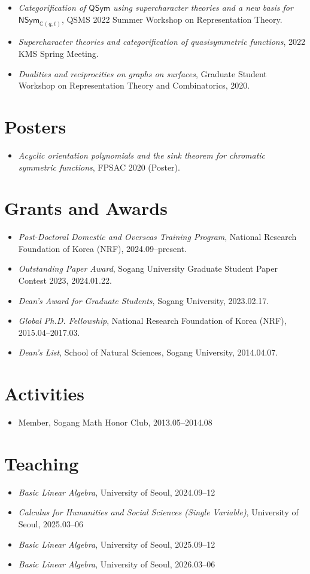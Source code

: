 \documentclass[11pt,a4paper]{article}
\newcommand{\cvsection}[1]{\Needspace{4\baselineskip}\section*{#1}}
\begin{document}
\begin{itemize}
  Miniworkshop on Representation Theory of $0$-Hecke Algebras and Related Topics, 2023.02.
\item \emph{Categorification of $\mathsf{QSym}$ using supercharacter theories and a new basis for $\mathsf{NSym}_{\mathbb C(q,t)}$},
  QSMS 2022 Summer Workshop on Representation Theory.
\item \emph{Supercharacter theories and categorification of quasisymmetric functions},
  2022 KMS Spring Meeting.
\item \emph{Dualities and reciprocities on graphs on surfaces},
  Graduate Student Workshop on Representation Theory and Combinatorics, 2020.
\end{itemize}

\cvsection{Posters}
\begin{itemize}
\item \emph{Acyclic orientation polynomials and the sink theorem for chromatic symmetric functions},
  FPSAC 2020 (Poster).
\end{itemize}

\cvsection{Grants and Awards}
\begin{itemize}
\item \emph{Post-Doctoral Domestic and Overseas Training Program},
  National Research Foundation of Korea (NRF), 2024.09--present.
\item \emph{Outstanding Paper Award},
  Sogang University Graduate Student Paper Contest 2023, 2024.01.22.
\item \emph{Dean's Award for Graduate Students},
  Sogang University, 2023.02.17.
\item \emph{Global Ph.D. Fellowship},
  National Research Foundation of Korea (NRF), 2015.04--2017.03.
\item \emph{Dean's List},
  School of Natural Sciences, Sogang University, 2014.04.07.
\end{itemize}

\cvsection{Activities}
\begin{itemize}
\item Member, Sogang Math Honor Club, 2013.05--2014.08
\end{itemize}

\cvsection{Teaching}
\begin{itemize}
\item \emph{Basic Linear Algebra}, University of Seoul, 2024.09--12
\item \emph{Calculus for Humanities and Social Sciences (Single Variable)},
  University of Seoul, 2025.03--06
\item \emph{Basic Linear Algebra}, University of Seoul, 2025.09--12
\item \emph{Basic Linear Algebra}, University of Seoul, 2026.03--06
\end{itemize}
\end{document}
